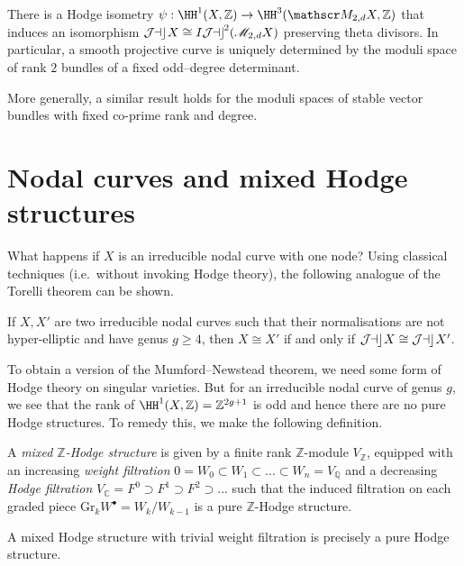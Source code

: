 \begin{theorem}
    There is a Hodge isometry \(\psi:\HH^1(X,\mathbb{Z})\to
    \HH^3(\Moduli_{2,d}X,\mathbb{Z})\) that induces an isomorphism
    \(\mathop{\mathcal{J\kern -0.5pt a\kern -0.5pt c\kern -1pt}} X\cong \mathop{I\mathcal{J\kern -0.5pt a\kern -0.5pt c\kern -1pt}}^2(\mathscr{M}_{2,d}X)\) preserving theta divisors. In
    particular, a smooth projective curve is uniquely determined by the moduli
    space of rank \(2\) bundles of a fixed odd--degree determinant.
\end{theorem}

More generally, a similar result holds for the moduli spaces of stable vector
bundles with fixed co-prime rank and degree.

\section{Nodal curves and mixed Hodge structures}

What happens if \(X\) is an irreducible nodal curve with one node? Using
classical techniques (i.e.\ without invoking Hodge theory), the following
analogue of the Torelli theorem can be shown.

\begin{theorem}[(Namikawa)]
    If \(X,X'\) are two irreducible nodal curves such that their normalisations
    are not hyper-elliptic and have genus \(g\geq 4\), then \(X\cong X'\) if and
    only if \(\mathop{\mathcal{J\kern -0.5pt a\kern -0.5pt c\kern -1pt}} X\cong \mathop{\mathcal{J\kern -0.5pt a\kern -0.5pt c\kern -1pt}} X'\).
\end{theorem}

To obtain a version of the Mumford--Newstead theorem, we need some form of Hodge
theory on singular varieties. But for an irreducible nodal curve of genus \(g\),
we see that the rank of \(\HH^1(X,\mathbb{Z})=\mathbb{Z}^{2g+1}\) is odd and
hence there are no pure Hodge structures. To remedy this, we make the following
definition.

\begin{definition}
    A \textit{mixed \(\mathbb{Z}\)-Hodge structure} is given by a finite
    rank \(\mathbb{Z}\)-module \(V_\mathbb{Z}\), equipped with an
    increasing \textit{weight filtration} \(0=W_0\subset W_1\subset...\subset
    W_n=V_\mathbb{Q}\) and a decreasing \textit{Hodge filtration}
    \(V_\mathbb{C}=F^0\supset F^1\supset F^2\supset ...\) such that the induced
    filtration on each graded piece \(\text{Gr}_kW^\bullet=W_k/W_{k-1}\) is a
    pure \(\mathbb{Z}\)-Hodge structure.
\end{definition}

\begin{example}
    A mixed Hodge structure with trivial weight filtration is precisely a pure
    Hodge structure.
\end{example}

